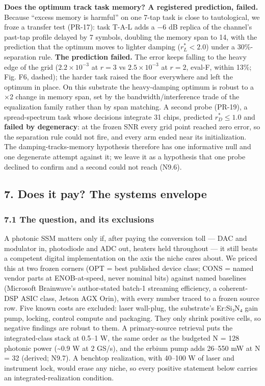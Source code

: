 \documentclass[
  10pt,
]{article}
\begin{document}
\textbf{Does the optimum track task memory? A registered prediction,
failed.} Because ``excess memory is harmful'' on one 7-tap task is close
to tautological, we froze a transfer test (PR-17): task T-A-L adds a −6
dB replica of the channel's past-tap profile delayed by 7 symbols,
doubling the memory span to 14, with the prediction that the optimum
moves to lighter damping (\(r^*_L < 2.0\)) under a 30\%-separation rule.
\textbf{The prediction failed.} The error keeps falling to the heavy
edge of the grid (\(2.2\times10^{-3}\) at \(r = 3\) vs
\(2.5\times10^{-3}\) at \(r = 2\), eval-F, within 13\%; Fig. F6,
dashed); the harder task raised the floor everywhere and left the
optimum in place. On this substrate the heavy-damping optimum is robust
to a ×2 change in memory span, set by the bandwidth/interference trade
of the equalization family rather than by span matching. A second probe
(PR-19), a spread-spectrum task whose decisions integrate 31 chips,
predicted \(r^*_D \leq 1.0\) and \textbf{failed by degeneracy}: at the
frozen SNR every grid point reached zero error, so the separation rule
could not fire, and every arm ended near its initialization. The
damping-tracks-memory hypothesis therefore has one informative null and
one degenerate attempt against it; we leave it as a hypothesis that one
probe declined to confirm and a second could not reach (N9.6).

\subsection{7. Does it pay? The systems
envelope}\label{does-it-pay-the-systems-envelope}

\subsubsection{7.1 The question, and its
exclusions}\label{the-question-and-its-exclusions}

A photonic SSM matters only if, after paying the conversion toll --- DAC
and modulator in, photodiode and ADC out, heaters held throughout --- it
still beats a competent digital implementation on the axis the niche
cares about. We priced this at two frozen corners (OPT = best published
device class; CONS = named vendor parts at ENOB-at-speed, never nominal
bits) against named baselines (Microsoft Brainwave's author-stated
batch-1 streaming efficiency, a coherent-DSP ASIC class, Jetson AGX
Orin), with every number traced to a frozen source row. Five known costs
are excluded: laser wall-plug, the substrate's Er:Si₃N₄ gain pump,
locking, control compute and packaging. They only shrink positive cells,
so negative findings are robust to them. A primary-source retrieval puts
the integrated-class stack at 0.5--1 W, the same order as the budgeted N
= 128 photonic power (\textasciitilde0.9 W at 2 GS/s), and the erbium
pump adds 26--550 mW at N = 32 (derived; N9.7). A benchtop realization,
with 40--100 W of laser and instrument lock, would erase any niche, so
every positive statement below carries an integrated-realization
condition.
\end{document}

